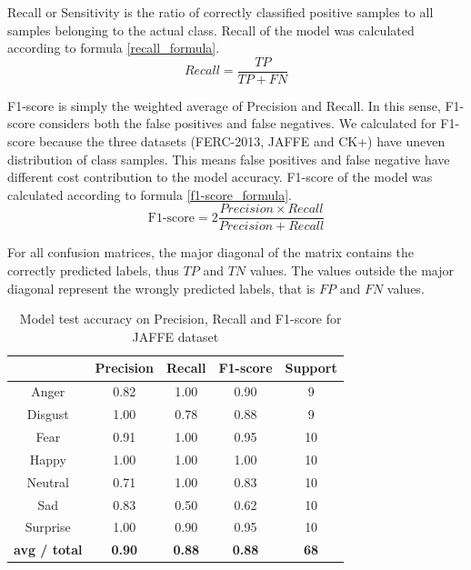\documentclass[master]{thesis-uestc}
\begin{document}
Recall or Sensitivity is the ratio of correctly classified positive samples to all samples belonging to the actual class. Recall of the model was calculated according to formula \ref{recall_formula}.
\begin{equation}
Recall=\frac{TP}
 {TP + FN}
\label{recall_formula}
\end{equation}

F1-score is simply the weighted average of Precision and Recall. In this sense, F1-score considers both the false positives and false negatives. We calculated for F1-score because the three datasets (FERC-2013, JAFFE and CK+) have uneven distribution of class samples. This means false positives and false negative have different cost contribution to the model accuracy. F1-score of the model was calculated according to formula \ref{f1-score_formula}.
\begin{equation}
\text{F1-score}=2\frac{Precision \times Recall}
 {Precision + Recall}
\label{f1-score_formula}
\end{equation}

For all confusion matrices, the major diagonal of the matrix contains the correctly predicted labels, thus $TP$ and $TN$ values. The values outside the major diagonal represent the wrongly predicted labels, that is $FP$ and $FN$ values.

\begin{table}[ht]
\renewcommand{\arraystretch}{1.3}
\caption{\,\,\,\,\,Model test accuracy on Precision, Recall and F1-score for JAFFE dataset}
\label{table_jaffe_scores}
\begin{center}
\begin{tabular}{|c|c|c|c|c|}

\hline
 & Precision & Recall & F1-score & Support\\ \hline

Anger & 0.82 & 1.00 & 0.90 & 9\\ \hline
Disgust & 1.00 & 0.78 & 0.88 & 9\\ \hline
Fear & 0.91 & 1.00 & 0.95 & 10\\ \hline
Happy & 1.00 & 1.00 & 1.00 & 10\\ \hline
Neutral & 0.71 & 1.00 & 0.83 & 10\\ \hline
Sad & 0.83 & 0.50 & 0.62 & 10\\ \hline
Surprise & 1.00 & 0.90 & 0.95 & 10\\ \hline

\textbf{avg / total} & \textbf{0.90} & \textbf{0.88} & \textbf{0.88} & \textbf{68}\\ \hline
\end{tabular}
\end{center}
\end{table}
\end{document}
